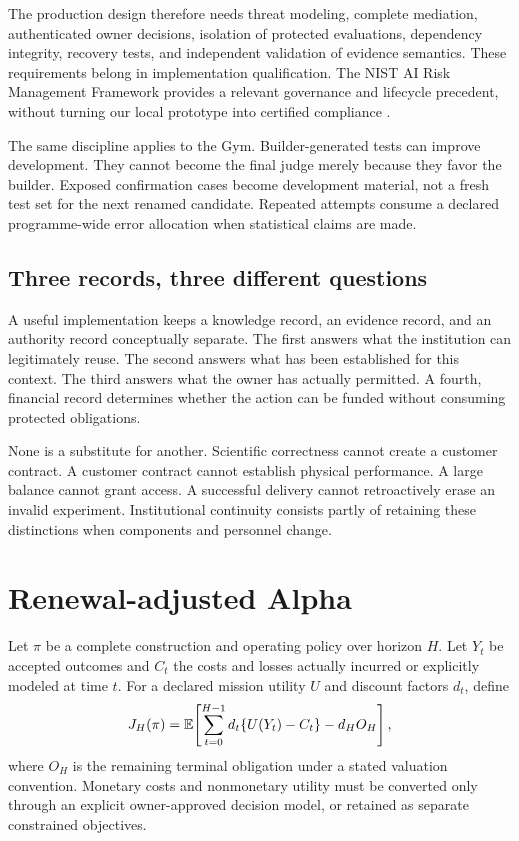 The production design therefore needs threat modeling, complete mediation, authenticated owner decisions, isolation of protected evaluations, dependency integrity, recovery tests, and independent validation of evidence semantics. These requirements belong in implementation qualification. The NIST AI Risk Management Framework provides a relevant governance and lifecycle precedent, without turning our local prototype into certified compliance \citep{nistRMF}.

The same discipline applies to the Gym. Builder-generated tests can improve development. They cannot become the final judge merely because they favor the builder. Exposed confirmation cases become development material, not a fresh test set for the next renamed candidate. Repeated attempts consume a declared programme-wide error allocation when statistical claims are made.

\subsection{Three records, three different questions}
A useful implementation keeps a knowledge record, an evidence record, and an authority record conceptually separate. The first answers what the institution can legitimately reuse. The second answers what has been established for this context. The third answers what the owner has actually permitted. A fourth, financial record determines whether the action can be funded without consuming protected obligations.

None is a substitute for another. Scientific correctness cannot create a customer contract. A customer contract cannot establish physical performance. A large balance cannot grant access. A successful delivery cannot retroactively erase an invalid experiment. Institutional continuity consists partly of retaining these distinctions when components and personnel change.

\section{Renewal-adjusted Alpha}
\label{sec:alpha}
Let $\pi$ be a complete construction and operating policy over horizon $H$. Let $Y_t$ be accepted outcomes and $C_t$ the costs and losses actually incurred or explicitly modeled at time $t$. For a declared mission utility $U$ and discount factors $d_t$, define
\begin{equation}
 J_H(\pi)=\mathbb{E}\!\left[\sum_{t=0}^{H-1}d_t\{U(Y_t)-C_t\}-d_H O_H\right],
\end{equation}
where $O_H$ is the remaining terminal obligation under a stated valuation convention. Monetary costs and nonmonetary utility must be converted only through an explicit owner-approved decision model, or retained as separate constrained objectives.

